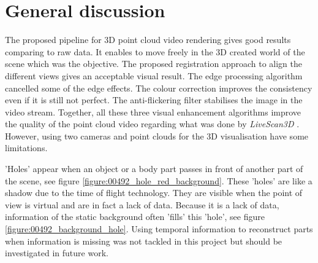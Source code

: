 \section{General discussion}
\label{section:general_discussion}

The proposed pipeline for 3D point cloud video rendering gives good results comparing to raw data. It enables to move freely in the 3D created world of the scene which was the objective. The proposed registration approach to align the different views gives an acceptable visual result. The edge processing algorithm cancelled some of the edge effects. The colour correction improves the consistency even if it is still not perfect. The anti-flickering filter stabilises the image in the video stream. Together, all these three visual enhancement algorithms improve the quality of the point cloud video regarding what was done by \textit{LiveScan3D} \cite{kowalski_livescan3d:_2015}. However, using two cameras and point clouds for the 3D visualisation have some limitations.

'Holes' appear when an object or a body part passes in front of another part of the scene, see figure \ref{figure:00492_hole_red_background}. These 'holes' are like a shadow due to the time of flight technology. They are visible when the point of view is virtual and are in fact a lack of data. Because it is a lack of data, information of the static background often 'fills' this 'hole', see figure \ref{figure:00492_background_hole}. Using temporal information to reconstruct parts when information is missing was not tackled in this project but should be investigated in future work.

